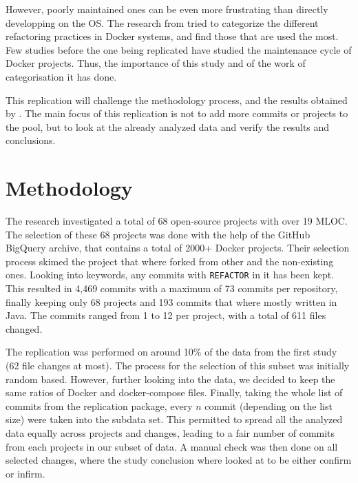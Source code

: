 \documentclass[lettersize,journal]{IEEEtran}
\begin{document}
However, poorly maintained ones can be even more frustrating than directly developping on the OS.
The research from \cite{1} tried to categorize the different refactoring practices in Docker systems, and find those that are used the most.
Few studies before the one being replicated have studied the maintenance cycle of Docker projects.
Thus, the importance of this study and of the work of categorisation it has done.

This replication will challenge the methodology process, and the results obtained by \cite{1}.
The main focus of this replication is not to add more commits or projects to the pool, but to look at the already analyzed data and verify the results and conclusions.

\section{Methodology}

The research investigated a total of 68 open-source projects with over 19 MLOC.
The selection of these 68 projects was done with the help of the GitHub BigQuery archive, that contains a total of 2000+ Docker projects.
Their selection process skimed the project that where forked from other and the non-existing ones.
Looking into keywords, any commits with \texttt{REFACTOR} in it has been kept.
This resulted in 4,469 commits with a maximum of 73 commits per repository, finally keeping only 68 projects and 193 commits that where mostly written in Java.
The commits ranged from 1 to 12 per project, with a total of 611 files changed.

The replication was performed on around 10\% of the data from the first study (62 file changes at most).
The process for the selection of this subset was initially random based.
However, further looking into the data, we decided to keep the same ratios of Docker and docker-compose files.
Finally, taking the whole list of commits from the replication package, every \(n\) commit (depending on the list size) were taken into the subdata set.
This permitted to spread all the analyzed data equally across projects and changes, leading to a fair number of commits from each projects in our subset of data.
A manual check was then done on all selected changes, where the study conclusion where looked at to be either confirm or infirm.
\end{document}
